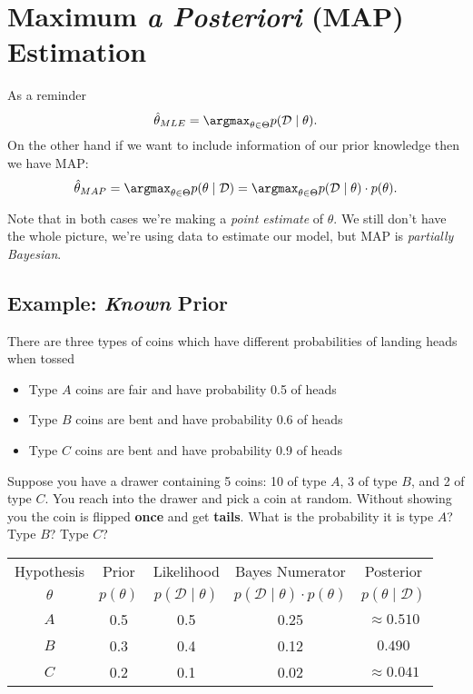 \section{Maximum \textit{a Posteriori} (MAP) Estimation}

As a reminder 
\[\hat\theta_{MLE} = \argmax_{\theta\in\Theta} p(\mathcal{D}\mid \theta).\]
On the other hand if we want to include information of our prior knowledge 
then we have MAP:
\[\hat\theta_{MAP} = \argmax_{\theta\in\Theta} p(\theta\mid\mathcal{D}) =  \argmax_{\theta\in\Theta} p(\mathcal{D}\mid \theta)\cdot p(\theta).\]

Note that in both cases we're making a \emph{point estimate} of $\theta$. 
We still don't have the whole picture, we're using data to estimate our model, 
but MAP is \emph{partially Bayesian}. 


\subsection{Example: \textit{Known} Prior}
There are three types of coins which have different probabilities of landing heads when tossed
\begin{itemize}
\item[] Type $A$ coins are fair and have probability 0.5 of heads
\item[] Type $B$ coins are bent and have probability 0.6 of heads
\item[] Type $C$ coins are bent and have probability 0.9 of heads
\end{itemize}

Suppose you have a drawer containing 5 coins: 
10 of type $A$, 3 of type $B$, and 2 of type $C$. 
You reach into the drawer and pick a coin at random. 
Without showing you the coin is flipped \textbf{once} and get \textbf{tails}. 
What is the probability it is type $A$? Type $B$? Type $C$? 

\begin{center}
\begin{tabular}{|c||c|c|c|c|}
\hline
Hypothesis & Prior & Likelihood & Bayes Numerator & Posterior\\
$\theta$ & $p(\theta)$ & $p(\mathcal{D}\mid\theta)$ & $p(\mathcal{D}\mid\theta)\cdot p(\theta)$ & $p(\theta\mid\mathcal{D})$\\
\hline
\hline
$A$	& 0.5		& 0.5		& 0.25	& $\approx0.510$\\
$B$	& 0.3		& 0.4		& 0.12	& $0.490$\\
$C$	& 0.2		& 0.1		& 0.02	& $\approx0.041$\\
\hline
\end{tabular}
\end{center}

